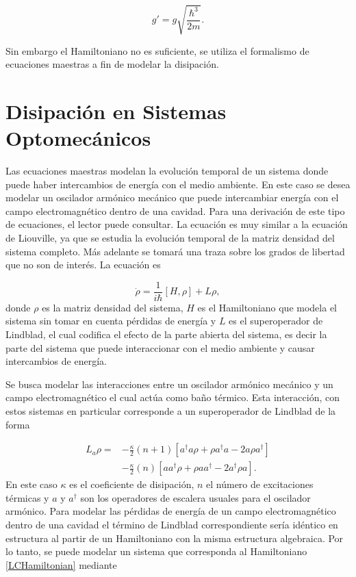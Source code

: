 \documentclass[10pt,a4paper]{report}
\begin{document}
\begin{equation}
g'=g\sqrt{\frac{\hbar^3}{2m}}.
\end{equation}

Sin embargo el Hamiltoniano no es suficiente, se utiliza el formalismo de ecuaciones maestras a fin de modelar la disipación. 

\section{Disipación en Sistemas Optomecánicos}

Las ecuaciones maestras modelan la evolución temporal de un sistema donde puede haber intercambios de energía con el medio ambiente. En este caso se desea modelar un oscilador armónico mecánico que puede intercambiar energía con el campo electromagnético dentro de una cavidad. Para una derivación de este tipo de ecuaciones, el lector puede consultar\cite{ZollerQN}. La ecuación es muy similar a la ecuación de Liouville, ya que se estudia la evolución temporal de la matriz densidad del sistema completo. Más adelante se tomará una traza sobre los grados de libertad que no son de interés. La ecuación es

\begin{equation}\label{MasterEq}
\dot{\rho} = \frac{1}{i\hbar}[H,\rho] + L\rho,
\end{equation} donde $\rho$ es la matriz densidad del sistema, $H$ es el Hamiltoniano que modela el sistema sin tomar en cuenta pérdidas de energía y $L$ es el superoperador de Lindblad, el cual codifica el efecto de la parte abierta del sistema, es decir la parte del sistema que puede interaccionar con el medio ambiente y causar intercambios de energía.

Se busca modelar las interacciones entre un oscilador armónico mecánico y un campo electromagnético el cual actúa como baño térmico. Esta interacción, con estos sistemas en particular corresponde a un superoperador de Lindblad de la forma \cite{EnglertDB}

\begin{align}\label{EMField}
L_a \rho =& - \frac{\kappa}{2}(n + 1)[a^\dagger a\rho + \rho a^\dagger a -2a\rho a^\dagger] \nonumber \\
 &- \frac{\kappa}{2}(n)[ aa^\dagger\rho + \rho  aa^\dagger -2a^\dagger\rho a].
\end{align} En este caso $\kappa$ es el coeficiente de disipación, $n$ el número de excitaciones térmicas y $a$ y $a^\dagger$ son los operadores de escalera usuales para el oscilador armónico. Para modelar las pérdidas de energía de un campo electromagnético dentro de una cavidad el término de Lindblad correspondiente sería idéntico en estructura al partir de un Hamiltoniano con la misma estructura algebraica. Por lo tanto, se puede modelar un sistema que corresponda al Hamiltoniano \eqref{LCHamiltonian} mediante
\end{document}
